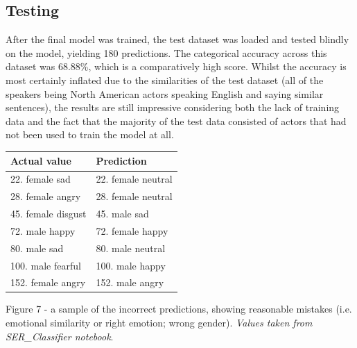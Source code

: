 \documentclass[12pt]{article}
\begin{document}
\subsection{Testing}
After the final model was trained, the test dataset was loaded and tested blindly on the model, yielding 180 predictions. The categorical accuracy across this dataset was 68.88\%, which is a comparatively high score. Whilst the accuracy is most certainly inflated due to the similarities of the test dataset (all of the speakers being North American actors speaking English and saying similar sentences), the results are still impressive considering both the lack of training data and the fact that the majority of the test data consisted of actors that had not been used to train the model at all. 
\begin{center}
\begin{tabularx}{\textwidth}{ |X|X| }
\hline 
  \textbf{Actual value} & \textbf{Prediction} \\
  \hline
  22. female sad & 22. female neutral \\
  \hline
  28. female angry & 28. female neutral \\
  \hline
  45. female disgust & 45. male sad \\
  \hline
  72. male happy & 72. female happy \\
  \hline
  80. male sad & 80. male neutral \\
  \hline
  100. male fearful & 100. male happy \\
  \hline
  152. female angry & 152. male angry \\
  \hline
\end{tabularx}
\end{center}
Figure 7 - a sample of the incorrect predictions, showing reasonable mistakes (i.e. emotional similarity or right emotion; wrong gender). \textit{Values taken from SER\_Classifier notebook}.
\\
\end{document}
